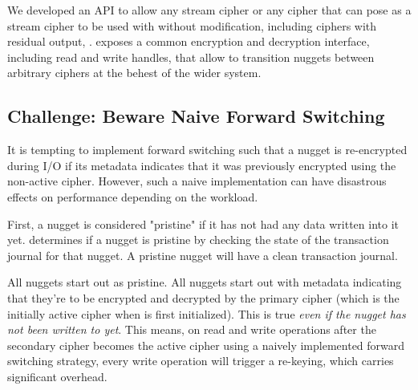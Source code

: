  We developed an API to allow any stream cipher or any
cipher that can pose as a stream cipher to be used with \SYSTEM{} without
modification, including ciphers with residual output, .  \SYSTEM{} exposes a common encryption and decryption interface,
including read and write handles, that allow \SYSTEM{} to transition nuggets
between arbitrary ciphers at the behest of the wider system. 

\subsection{Challenge: Beware Naive Forward Switching}

It is tempting to implement forward switching such that a nugget is re-encrypted
during I/O if its metadata indicates that it was previously encrypted using the
non-active cipher. However, such a naive implementation can have disastrous
effects on performance depending on the workload.

First, a nugget is considered "pristine" if it has not had any data written into
it yet. \SYSTEM{} determines if a nugget is pristine by checking the state of
the transaction journal for that nugget. A pristine nugget will have a clean
transaction journal.

All nuggets start out as pristine. All nuggets start out with metadata
indicating that they're to be encrypted and decrypted by the primary cipher
(which is the initially active cipher when \SYSTEM{} is first initialized). This
is true \emph{even if the nugget has not been written to yet}. This means, on
read and write operations after the secondary cipher becomes the active cipher
using a naively implemented forward switching strategy, every write operation
will trigger a re-keying, which carries significant overhead.

